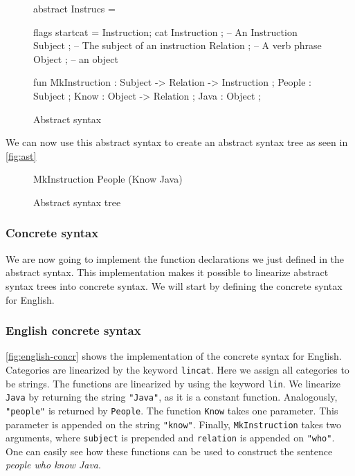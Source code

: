 \begin{figure}[h]
\begin{code}
abstract Instrucs = { 
  flags startcat = Instruction; 
  cat
    Instruction ; -- An Instruction
    Subject ;  -- The subject of an instruction
    Relation ; -- A verb phrase
    Object ;   -- an object

  fun		 	  
    MkInstruction : Subject -> Relation -> Instruction ;
    People : Subject ;
    Know : Object -> Relation ;
    Java : Object ; 
}
\end{code}
\caption{Abstract syntax\label{fig:abstract-syntax}}
\end{figure}

We can now use this abstract syntax to create an abstract syntax tree as seen in \autoref{fig:ast}

\begin{figure}[h]
\begin{plaintext}
MkInstruction People (Know Java)
\end{plaintext}
\caption{Abstract syntax tree\label{fig:ast}}
\end{figure}

\subsubsection*{Concrete syntax}

We are now going to implement the function declarations we just defined in the abstract syntax. This implementation makes it possible to linearize abstract syntax trees into concrete syntax. We will start by defining the concrete syntax for English.

\subsubsection*{English concrete syntax}

\autoref{fig:english-concr} shows the implementation of the concrete syntax for English. Categories are linearized by the keyword \texttt{lincat}. Here we assign all categories to be strings. The functions are linearized by using the keyword \texttt{lin}. We linearize \texttt{Java} by returning the string \texttt{"Java"}, as it is a constant function. Analogously, \texttt{"people"} is returned by \texttt{People}. The function \texttt{Know} takes one parameter. This parameter is appended on the string \texttt{"know"}. Finally, \texttt{MkInstruction} takes two arguments, where \texttt{subject} is prepended and \texttt{relation} is appended on \texttt{"who"}. One can easily see how these functions can be used to construct the sentence \emph{people who know Java}.

